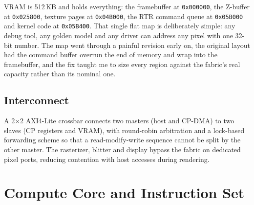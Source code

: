 \documentclass[conference]{IEEEtran}
\begin{document}
\begin{center}
\end{center}

VRAM is 512\,KB and holds everything: the framebuffer at \texttt{0x000000}, the
Z-buffer at \texttt{0x025800}, texture pages at \texttt{0x04B000}, the RTR
command queue at \texttt{0x05B000} and kernel code at \texttt{0x05B400}. That
single flat map is deliberately simple: any debug tool, any golden model and any
driver can address any pixel with one 32-bit number. The map went through a
painful revision early on, the original layout had the command buffer
overrun the end of memory and wrap into the framebuffer, and the fix taught
me to size every region against the fabric's real capacity rather than its
nominal one.

\subsection{Interconnect}

A 2$\times$2 AXI4-Lite crossbar connects two masters (host and CP-DMA) to two
slaves (CP registers and VRAM), with round-robin arbitration and a lock-based
forwarding scheme so that a read-modify-write sequence cannot be split by the
other master. The rasterizer, blitter and display bypass the fabric on dedicated
pixel ports, reducing contention with host accesses during rendering.

\section{Compute Core and Instruction Set}
\label{sec:core}
\end{document}
